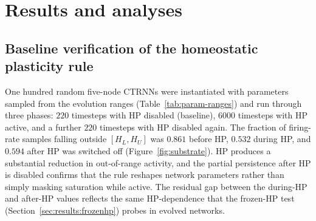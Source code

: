 %
%
%

\section{Results and analyses}
\label{sec:results}

\subsection{Baseline verification of the homeostatic plasticity rule}
\label{sec:results:substrate}

One hundred random five-node CTRNNs were instantiated with parameters sampled
from the evolution ranges (Table~\ref{tab:param-ranges}) and run through three
phases: $220$ timesteps with HP disabled (baseline), $6000$ timesteps with HP
active, and a further $220$ timesteps with HP disabled again. The fraction of
firing-rate samples falling outside $[H_L, H_U]$ was $0.861$ before HP, $0.532$
during HP, and $0.594$ after HP was switched off (Figure~\ref{fig:substrate}).
HP produces a substantial reduction in out-of-range activity, and the partial
persistence after HP is disabled confirms that the rule reshapes network
parameters rather than simply masking saturation while active. The residual gap
between the during-HP and after-HP values reflects the same HP-dependence that
the frozen-HP test (Section~\ref{sec:results:frozenhp}) probes in evolved
networks.

